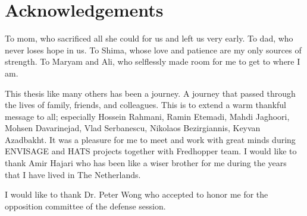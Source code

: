 %
\chapter*{Acknowledgements}
\label{sec:acknowledgement}
\vspace*{-10mm}

To mom, who sacrificed all she could for us and left us very early.
To dad, who never loses hope in us.
To Shima, whose love and patience are my only sources of strength.
To Maryam and Ali, who selflessly made room for me to get to where I am.

This thesis like many others has been a journey.
A journey that passed through the lives of family, friends, and colleagues.
This is to extend a warm thankful message to all; especially
Hossein Rahmani, Ramin Etemadi, Mahdi Jaghoori, Mohsen Davarinejad,
Vlad Serbanescu, Nikolaos Bezirgiannis, Keyvan Azadbakht.
It was a pleasure for me to meet and work with great minds during
ENVISAGE and HATS projects together with Fredhopper team.
I would like to thank Amir Hajari who has been like a wiser brother 
for me during the years that I have lived in The Netherlands.

I would like to thank Dr. Peter Wong who accepted to honor me for the opposition
committee of the defense session.
